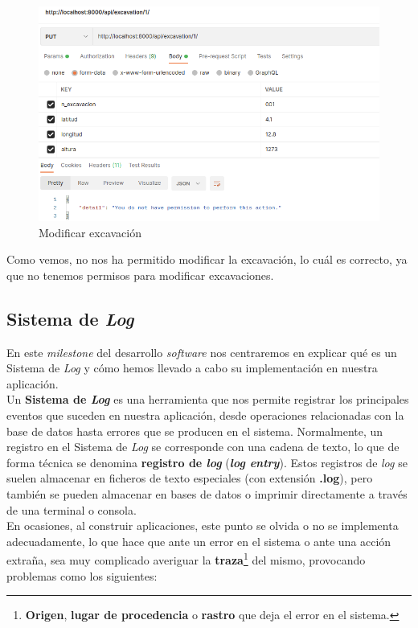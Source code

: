         \begin{figure}[H]
            \centering
            \includegraphics[scale=0.40]{imagenes/put-excavation.png}
            \caption{Modificar excavación}
            \label{fig:put-excavation}
        \end{figure}

Como vemos, no nos ha permitido modificar la excavación, lo cuál es correcto, ya que no
tenemos permisos para modificar excavaciones.

\subsection{Sistema de \textit{Log}}
En este \textit{milestone} del desarrollo \textit{software} nos centraremos en explicar qué
es un Sistema de \textit{Log} y cómo hemos llevado a cabo su implementación en nuestra
aplicación. \\

Un \textbf{Sistema de \textit{Log}} \cite{log-system} es una herramienta que nos permite
registrar los principales eventos que suceden en nuestra aplicación, desde operaciones
relacionadas con la base de datos hasta errores que se producen en el sistema. Normalmente,
un registro en el Sistema de \textit{Log} se corresponde con una cadena de texto, lo que de
forma técnica se denomina \textbf{registro de \textit{log}} (\textbf{\textit{log entry}}).
Estos registros de \textit{log} se suelen almacenar en ficheros de texto especiales (con
extensión \textbf{.log}), pero también se pueden almacenar en bases de datos o imprimir
directamente a través de una terminal o consola.\\

En ocasiones, al construir aplicaciones, este punto se olvida o no se implementa
adecuadamente, lo que hace que ante un error en el sistema o ante una acción extraña, sea
muy complicado averiguar la \textbf{traza}\footnote{\textbf{Origen},
\textbf{lugar de procedencia} o \textbf{rastro} que deja el error en el sistema.} del
mismo, provocando problemas como los siguientes:

